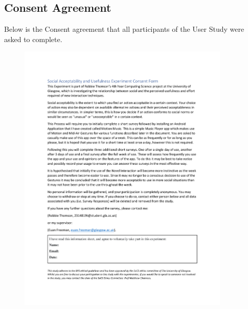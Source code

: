 \documentclass{l4proj}
\begin{document}
\begin{appendices}
\chapter{Consent Agreement}
Below is the Consent agreement that all participants of the User Study were asked to complete.
\begin{figure}[!htb]
    \centering
    \includegraphics[width=0.9\textwidth]{images/SocialAcceptabilityConsentForm.pdf}
\end{figure}



\end{appendices}
\end{document}
